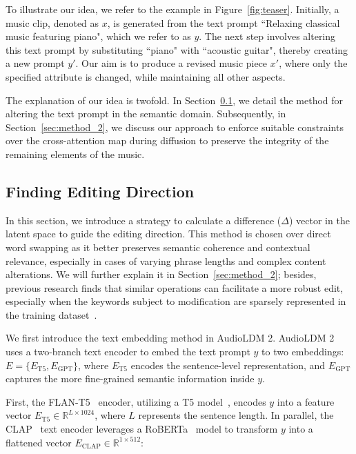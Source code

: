 To illustrate our idea, we refer to the example in Figure~\ref{fig:teaser}. Initially, a music clip, denoted as $x$, is generated from the text prompt ``Relaxing classical music featuring piano", which we refer to as $y$. The next step involves altering this text prompt by substituting ``piano" with ``acoustic guitar", thereby creating a new prompt $y'$. Our aim is to produce a revised music piece $x'$, where only the specified attribute is changed, while maintaining all other aspects.

The explanation of our idea is twofold. In Section~\ref{sec:method_1}, we detail the method for altering the text prompt in the semantic domain. Subsequently, in Section~\ref{sec:method_2}, we discuss our approach to enforce suitable constraints over the cross-attention map during diffusion to preserve the integrity of the remaining elements of the music.

\subsection{Finding Editing Direction}\label{sec:method_1}

In this section, we introduce a strategy to calculate a difference ($\Delta$) vector in the latent space to guide the editing direction. This method is chosen over direct word swapping as it better preserves semantic coherence and contextual relevance, especially in cases of varying phrase lengths and complex content alterations. We will further explain it in Section~\ref{sec:method_2}; besides, previous research finds that similar operations can facilitate a more robust edit, especially when the keywords subject to modification are sparsely represented in the training dataset~\cite{pix2pix}.

We first introduce the text embedding method in Audio\-LDM 2. AudioLDM 2 uses a two-branch text encoder to embed the text prompt $y$ to two embeddings: $E = \{E_\text{T5}, E_\text{GPT}\}$, where $E_\text{T5}$ encodes the sentence-level representation, and $E_\text{GPT}$ captures the more fine-grained semantic information inside $y$.

First, the FLAN-T5~\cite{flant5} encoder, utilizing a T5 model~\cite{t5}, encodes \( y \) into a feature vector \( E_\text{T5} \in \mathbb{R}^{L \times 1024} \), where $L$ represents the sentence length. In parallel, the CLAP~\cite{clap} text encoder leverages a RoBERTa~\cite{roberta} model to transform \( y \) into a flattened vector \( E_\text{CLAP} \in \mathbb{R}^{1 \times 512} \): 

